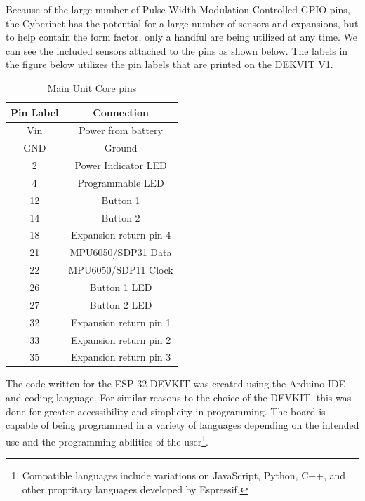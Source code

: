  

Because of the large number of Pulse-Width-Modulation-Controlled GPIO pins, the Cyberinet has the potential for a large number of sensors and expansions, but to help contain the form factor, only a handful are being utilized at any time. We can see the included sensors attached to the pins as shown below. The labels in the figure below utilizes the pin labels that are printed on the DEKVIT V1.

\begin{table}[]
    \centering
    \begin{tabular}{|c||c|}
    \hline
    Pin Label & Connection\\
    \hline
    \hline
    Vin     & Power from battery \\
     \hline
    GND     & Ground \\
     \hline
    2       & Power Indicator LED \\
     \hline
    4       & Programmable LED \\
     \hline
    12      & Button 1 \\
     \hline
    14      & Button 2 \\
     \hline
    18      & Expansion return pin 4 \\
    \hline
    21      & MPU6050/SDP31 Data \\
     \hline
    22      & MPU6050/SDP11 Clock \\
    \hline
    26      & Button 1 LED \\
    \hline
    27      & Button 2 LED \\
    \hline
    32      & Expansion return pin 1 \\
    \hline
    33      & Expansion return pin 2 \\
    \hline
    35      & Expansion return pin 3 \\
    \hline
    \end{tabular}
    \caption{Main Unit Core pins}
    \label{tab:mainPins}
\end{table}

The code written for the ESP-32 DEVKIT was created using the Arduino IDE and coding language. For similar reasons to the choice of the DEVKIT, this was done for greater accessibility and simplicity in programming. The board is capable of being programmed in a variety of languages depending on the intended use and the programming abilities of the user\footnote{Compatible languages include variations on JavaScript, Python, C++, and other propritary languages developed by Espressif.}. 


